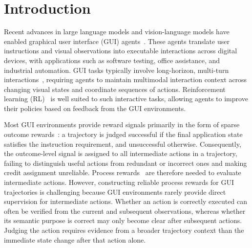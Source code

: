 \section{Introduction}
\label{sec:intro}

Recent advances in large language models and vision-language models have enabled graphical user interface (GUI) agents~\cite{cheng2024seeclick,hong2024cogagent,qin2025ui,lin2024showui,xu2024aguvis,gao2024multi,zhang2025tongui}. These agents translate user instructions and visual observations into executable interactions across digital devices, with applications such as software testing, office assistance, and industrial automation. GUI tasks typically involve long-horizon, multi-turn interactions~\cite{zhou2023webarena,rawles2024androidworld,xie2025osworld}, requiring agents to maintain multimodal interaction context across changing visual states and coordinate sequences of actions. Reinforcement learning (RL)~\cite{li2025dart,xiao2025uigenie,lu2025orcust,tang2026clawgui} is well suited to such interactive tasks, allowing agents to improve their policies based on feedback from the GUI environments.


Most GUI environments provide reward signals primarily in the form of sparse outcome rewards~\cite{xie2025osworld,li2025dart}: a trajectory is judged successful if the final application state satisfies the instruction requirement, and unsuccessful otherwise. Consequently, the outcome-level signal is assigned to all intermediate actions in a trajectory, failing to distinguish useful actions from redundant or incorrect ones and making credit assignment unreliable. Process rewards~\cite{lightman2023verify,wang2023mathshepherd,chen2025guishepherd} are therefore needed to evaluate intermediate actions. However, constructing reliable process rewards for GUI trajectories is challenging because GUI environments rarely provide direct supervision for intermediate actions. Whether an action is correctly executed can often be verified from the current and subsequent observations, whereas whether its semantic purpose is correct may only become clear after subsequent actions. Judging the action requires evidence from a broader trajectory context than the immediate state change after that action alone.

